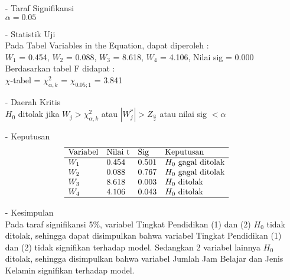 \begin{enumerate}
\begin{test}
{\begin{enumerate}
        \item[-] Taraf Signifikansi \\
        $\alpha = 0.05$
    
        \item[-] Statistik Uji \\
        Pada Tabel Variables in the Equation, dapat diperoleh : \\
        $W_1$ = 0.454, $W_2$ = 0.088, $W_3$ = 8.618, $W_4$ = 4.106, Nilai sig = 0.000 \\
        Berdasarkan tabel F didapat : \\
        $\chi$-tabel = $\chi_{\alpha, k}^2$ = $\chi_{0.05; 1}$ = 3.841
    
        \item[-] Daerah Kritis \\
        $H_0$ ditolak jika $W_j > \chi_{\alpha, k}^2$ atau $|W_j^*| > Z_{\frac{\alpha}{2}}$ atau nilai sig $< \alpha$
    
        \item[-] Keputusan \\
        $$\begin{array}{lllll}
            \hline 
            \text{Variabel} & \text{Nilai t} & \text{Sig} & \text{Keputusan}  \\
            \hline 
            W_1 & 0.454 & 0.501 & H_0 \text{ gagal ditolak} \\
            W_2 & 0.088 & 0.767 & H_0 \text{ gagal ditolak} \\
            W_3 & 8.618 & 0.003 & H_0 \text{ ditolak} \\
            W_4 & 4.106 & 0.043 & H_0 \text{ ditolak} \\
            \hline
        \end{array}$$
    
        \item[-] Kesimpulan \\
        Pada taraf signifikansi 5\%, variabel Tingkat Pendidikan (1) dan (2) $H_0$ tidak ditolak, sehingga dapat disimpulkan bahwa variabel Tingkat Pendidikan (1) dan (2) tidak signifikan terhadap model. Sedangkan 2 variabel lainnya $H_0$ ditolak, sehingga disimpulkan bahwa variabel Jumlah Jam Belajar dan Jenis Kelamin signifikan terhadap model.
    \end{enumerate}
    }
    \end{test}
    

\end{enumerate}
